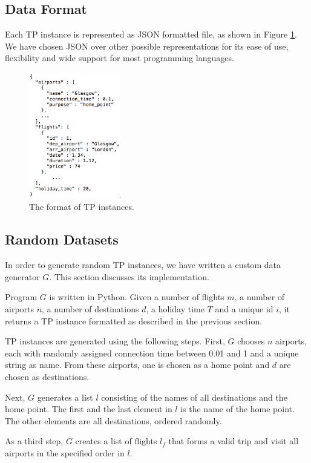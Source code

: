 \documentclass{mpaper}
\begin{document}
\subsection{Data Format}
Each TP instance is represented as JSON formatted file, as shown in Figure \ref{fig:dataFormat}. We have chosen JSON over other possible representations for its ease of use, flexibility and wide support for most programming languages.

\begin{figure}
\centering
\includegraphics[height=5.5cm, width=4cm]{images/dataFormat.png}
\caption{\label{fig:dataFormat}The format of TP instances.}
\end{figure}

\subsection{Random Datasets}
In order to generate random TP instances, we have written a custom data generator $G$. This section discusses its implementation.

Program $G$ is written in Python. Given a number of flights $m$, a number of airports $n$, a number of destinations $d$, a holiday time $T$ and a unique id $i$, it returns a TP instance formatted as described in the previous section.

TP instances are generated using the following steps. First, $G$ chooses $n$ airports, each with randomly assigned connection time between 0.01 and 1 and a unique string as name. From these airports, one is chosen as a home point and $d$ are chosen as destinations.

Next, $G$ generates a list $l$ consisting of the names of all destinations and the home point. The first and the last element in $l$ is the name of the home point. The other elements are all destinations, ordered randomly.

As a third step, $G$ creates a list of flights $l_f$ that forms a valid trip and visit all airports in the specified order in $l$.
\end{document}

